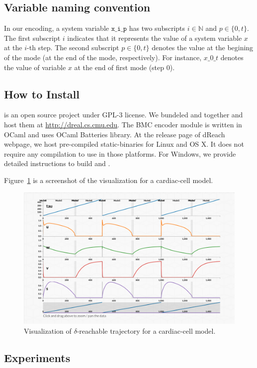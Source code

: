 \subsection{Variable naming convention}
In our encoding, a system variable $\texttt{x\_i\_p}$ has two
subscripts $i \in \mathbb{N}$ and $p \in \{0, t\}$. The first
subscript $i$ indicates that it represents the value of a system
variable $x$ at the $i$-th step. The second subscript $p \in \{0, t\}$
denotes the value at the begining of the mode (at the end of the mode,
respectively). For instance, $x\_0\_t$ denotes the value of variable
$x$ at the end of first mode (step $0$).

\subsection{How to Install}
\dReach{} is an open source project under GPL-3 license. We bundeled
\dReal{} and \dReach{} together and host them at
\url{http://dreal.cs.cmu.edu}. The BMC encoder module is written in
OCaml and uses OCaml Batteries library. At the release page of dReach
webpage, we host pre-compiled static-binaries for Linux and OS X. It
does not require any compilation to use \dReach{} in those
platforms. For Windows, we provide detailed instructions to build
\dReach{} and \dReal{}.

Figure~\ref{fig:viz} is a screenshot of the
visualization for a cardiac-cell model.
\begin{figure}
  \centering
  \includegraphics[width=\textwidth]{images/cardiac}
  \caption{Visualization of $\delta$-reachable trajectory for
    a cardiac-cell model.}
  \label{fig:viz}
\end{figure}

\subsection{Experiments}\label{sec:exp}

